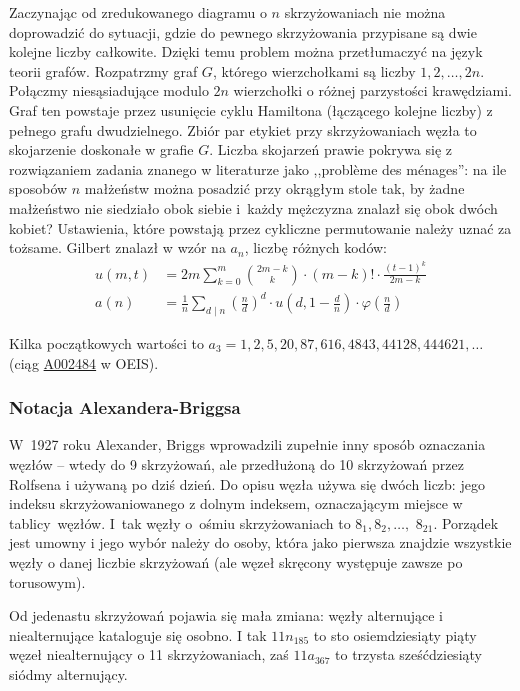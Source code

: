 Zaczynając od zredukowanego diagramu o $n$ skrzyżowaniach nie można doprowadzić do sytuacji, gdzie do pewnego skrzyżowania przypisane są dwie kolejne liczby całkowite.
Dzięki temu problem można przetłumaczyć na język teorii grafów.
Rozpatrzmy graf $G$, którego wierzchołkami są liczby $1, 2, \ldots, 2n$.
Połączmy niesąsiadujące modulo $2n$ wierzchołki o różnej parzystości krawędziami.
Graf ten powstaje przez usunięcie cyklu Hamiltona (łączącego kolejne liczby) z pełnego grafu dwudzielnego.
Zbiór par etykiet przy skrzyżowaniach węzła to skojarzenie doskonałe w grafie $G$.
Liczba skojarzeń prawie pokrywa się z rozwiązaniem zadania znanego w literaturze jako ,,problème des ménages'': na ile sposobów $n$ małżeństw można posadzić przy okrągłym stole tak, by żadne małżeństwo nie siedziało obok siebie i~każdy mężczyzna znalazł się obok dwóch kobiet?
Ustawienia, które powstają przez cykliczne permutowanie należy uznać za tożsame.
Gilbert znalazł w \cite{gilbert56} wzór na $a_n$, liczbę różnych kodów:
\begin{align}
u(m, t) & = 2m \sum_{k=0}^m {2m-k \choose k} \cdot (m-k)! \cdot \frac{(t-1)^k}{2m - k}  \\
a(n) & = \frac{1}{n} \sum_{d\mid n} \left(\frac{n}{d}\right)^d \cdot u \left(d, 1 - \frac{d}{n}\right) \cdot \varphi \left(\frac{n}{d}\right)
\end{align}

Kilka początkowych wartości to $a_3 = 1, 2, 5, 20, 87, 616, 4843, 44128, 444621, \ldots$ (ciąg \href{https://oeis.org/A002484}{A002484} w OEIS).

%

\subsubsection{Notacja Alexandera-Briggsa}
%
W~1927 roku Alexander, Briggs wprowadzili zupełnie inny sposób oznaczania węzłów -- wtedy do 9 skrzyżowań, ale przedłużoną do 10 skrzyżowań przez Rolfsena i używaną po dziś dzień.
Do opisu węzła używa się dwóch liczb: jego indeksu skrzyżowaniowanego z dolnym indeksem, oznaczającym miejsce w tablicy~węzłów.
I~tak węzły o~ośmiu skrzyżowaniach to $8_1, 8_2, \ldots,$ $8_{21}$.
Porządek jest umowny i jego wybór należy do osoby, która jako pierwsza znajdzie wszystkie węzły o danej liczbie skrzyżowań (ale węzeł skręcony występuje zawsze po torusowym).
%
%

Od jedenastu skrzyżowań pojawia się mała zmiana: węzły alternujące i niealternujące kataloguje się osobno.
I tak $11n_{185}$ to sto osiemdziesiąty piąty węzeł niealternujący o 11 skrzyżowaniach, zaś $11a_{367}$ to trzysta sześćdziesiąty siódmy alternujący.

